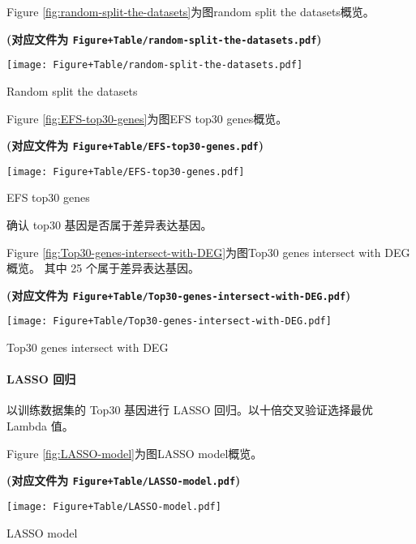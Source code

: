 \documentclass[
]{article}
\begin{document}
Figure \ref{fig:random-split-the-datasets}为图random split the datasets概览。

\textbf{(对应文件为 \texttt{Figure+Table/random-split-the-datasets.pdf})}

\def\@captype{figure}
\begin{center}
\texttt{[image: Figure+Table/random-split-the-datasets.pdf]}
\caption{Random split the datasets}\label{fig:random-split-the-datasets}
\end{center}

Figure \ref{fig:EFS-top30-genes}为图EFS top30 genes概览。

\textbf{(对应文件为 \texttt{Figure+Table/EFS-top30-genes.pdf})}

\def\@captype{figure}
\begin{center}
\texttt{[image: Figure+Table/EFS-top30-genes.pdf]}
\caption{EFS top30 genes}\label{fig:EFS-top30-genes}
\end{center}

确认 top30 基因是否属于差异表达基因。

Figure \ref{fig:Top30-genes-intersect-with-DEG}为图Top30 genes intersect with DEG概览。
其中 25 个属于差异表达基因。

\textbf{(对应文件为 \texttt{Figure+Table/Top30-genes-intersect-with-DEG.pdf})}

\def\@captype{figure}
\begin{center}
\texttt{[image: Figure+Table/Top30-genes-intersect-with-DEG.pdf]}
\caption{Top30 genes intersect with DEG}\label{fig:Top30-genes-intersect-with-DEG}
\end{center}

\hypertarget{lasso-ux56deux5f52}{%
\paragraph{LASSO 回归}\label{lasso-ux56deux5f52}}

以训练数据集的 Top30 基因进行 LASSO 回归。以十倍交叉验证选择最优 Lambda 值。

Figure \ref{fig:LASSO-model}为图LASSO model概览。

\textbf{(对应文件为 \texttt{Figure+Table/LASSO-model.pdf})}

\def\@captype{figure}
\begin{center}
\texttt{[image: Figure+Table/LASSO-model.pdf]}
\caption{LASSO model}\label{fig:LASSO-model}
\end{center}
\end{document}
